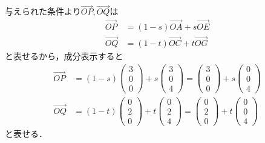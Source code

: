 \documentclass[../../main.tex]{subfiles}
\begin{document}
与えられた条件より$\overrightarrow{OP},\overrightarrow{OQ}$は
\begin{align}
  \overrightarrow{OP} &= (1-s)\overrightarrow{OA} + s\overrightarrow{OE} \\
  \overrightarrow{OQ} &= (1-t)\overrightarrow{OC} + t\overrightarrow{OG}
\end{align}
と表せるから，成分表示すると
\begin{align}
  \overrightarrow{OP}&=(1-s)
  \begin{pmatrix}3\\0\\0
  \end{pmatrix}
  +s
  \begin{pmatrix}3\\0\\4
  \end{pmatrix}
  =
  \begin{pmatrix}3\\0\\0
  \end{pmatrix}+s
  \begin{pmatrix}0\\0\\4
  \end{pmatrix} \label{eq:1}\\
  \overrightarrow{OQ}&=(1-t)
  \begin{pmatrix}0\\2\\0
  \end{pmatrix}
  +t
  \begin{pmatrix}0\\2\\4
  \end{pmatrix}
  =
  \begin{pmatrix}0\\2\\0
  \end{pmatrix}+t
  \begin{pmatrix}0\\0\\4
  \end{pmatrix} \label{eq:2}
\end{align}
と表せる．
\end{document}
